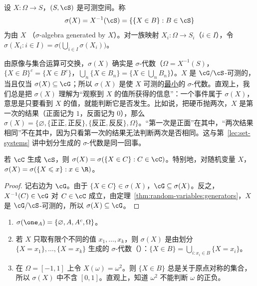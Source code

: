 
\begin{definition}\label{def:random-variables:sigma-X}
设 $X:\Omega\to S$，$(S,\cS)$ 是可测空间。称
\[
\sigma(X)=X^{-1}(\cS)=\{\{X\in B\}: B\in\cS\}
\]
为由 $X$ （$\sigma$-algebra generated by $X$）。对一族映射 $X_i:\Omega\to S_i$（$i\in I$），令 $\sigma(X_i:i\in I)=\sigma\bigl(\bigcup_{i\in I}\sigma(X_i)\bigr)$。
\end{definition}

由原像与集合运算可交换，$\sigma(X)$ 确实是 $\sigma$-代数（$\Omega=X^{-1}(S)$，$\{X\in B\}^c=\{X\in B^c\}$，$\bigcup_n\{X\in B_n\}=\{X\in\bigcup_nB_n\}$）。$X$ 是 $\cG/\cS$-可测的，当且仅当 $\sigma(X)\subseteq\cG$；所以 $\sigma(X)$ 是使 $X$ 可测的\uline{最小}的 $\sigma$-代数。直观上，我们总是把 $\sigma(X)$ 理解为“观察到 $X$ 的值所获得的信息”：一个事件属于 $\sigma(X)$，意思是只要看到 $X$ 的值，就能判断它是否发生。比如说，把硬币抛两次，$X$ 是第一次的结果（正面记为 $1$，反面记为 $0$），那么 $\sigma(X)=\{\varnothing,\{\text{正正},\text{正反}\},\{\text{反正},\text{反反}\},\Omega\}$。“第一次是正面”在其中，“两次结果相同”不在其中，因为只看第一次的结果无法判断两次是否相同。这与第~\ref{lec:set-systems} 讲中划分生成的 $\sigma$-代数是同一回事。

\begin{proposition}\label{prop:random-variables:sigma-generators}
若 $\cC$ 生成 $\cS$，则 $\sigma(X)=\sigma(\{X\in C\}:C\in\cC)$。特别地，对随机变量 $X$，$\sigma(X)=\sigma(\{X\leqslant x\}:x\in\R)$。
\end{proposition}
\begin{proof}
记右边为 $\cG$。由于 $\{X\in C\}\in\sigma(X)$，$\cG\subseteq\sigma(X)$。反之，$X^{-1}(C)\in\cG$ 对 $C\in\cC$ 成立，由定理~\ref{thm:random-variables:generators}，$X$ 是 $\cG/\cS$-可测的，所以 $\sigma(X)\subseteq\cG$。
\end{proof}

\begin{example}\label{ex:random-variables:sigma-examples}
\begin{enumerate}
\item $\sigma(\one_A)=\{\varnothing,A,A^c,\Omega\}$。
\item 若 $X$ 只取有限个不同的值 $x_1,\dots,x_k$，则 $\sigma(X)$ 是由划分 $\{X=x_1\},\dots,\{X=x_k\}$ 生成的 $\sigma$-代数（）：$\{X\in B\}=\bigcup_{i:x_i\in B}\{X=x_i\}$。
\item 在 $\Omega=[-1,1]$ 上令 $X(\omega)=\omega^2$。则 $\{X\in B\}$ 总是关于原点对称的集合，所以 $\sigma(X)$ 中不含 $[0,1]$。直观上，知道 $\omega^2$ 不能判断 $\omega$ 的正负。
\end{enumerate}
\end{example}

